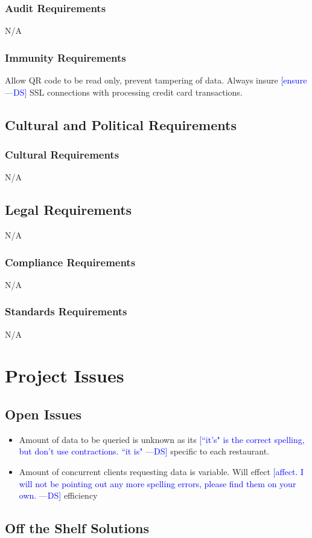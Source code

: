 \documentclass[12pt, titlepage]{article}
\newcommand{\authornote}[3]{\textcolor{#1}{[#3 ---#2]}}
\newcommand{\authornote}[3]{}
\newcommand{\ds}[1]{\authornote{blue}{DS}{#1}}
\begin{document}
\subsubsection{Audit Requirements}
N/A
\subsubsection{Immunity Requirements}
Allow QR code to be read only, prevent tampering of data. 	Always insure \ds{ensure} SSL connections with processing credit card transactions.
\subsection{Cultural and Political Requirements}
\subsubsection{Cultural Requirements}
N/A
\subsection{Legal Requirements}
N/A
\subsubsection{Compliance Requirements}
N/A
\subsubsection{Standards Requirements}
N/A

\section{Project Issues}
\subsection{Open Issues}
\begin{itemize}
\item Amount of data to be queried is unknown as its \ds{``it's" is the correct spelling, but don't use contractions. ``it is"} specific to each restaurant.
\item Amount of concurrent clients requesting data is variable. Will effect \ds{affect. I will not be pointing out any more spelling errors, please find them on your own.} efficiency
\end{itemize}
\subsection{Off the Shelf Solutions}
\end{document}
